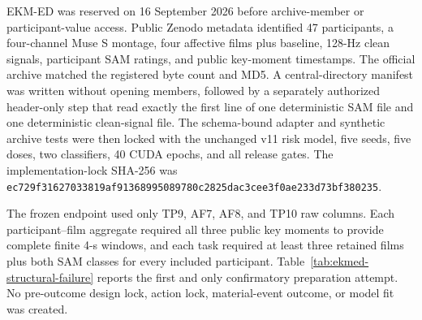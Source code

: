 \documentclass[preprint,12pt]{elsarticle}
\begin{document}
EKM-ED was reserved on 16 September 2026 before archive-member or participant-value access. Public Zenodo metadata identified 47 participants, a four-channel Muse S montage, four affective films plus baseline, 128-Hz clean signals, participant SAM ratings, and public key-moment timestamps. The official archive matched the registered byte count and MD5. A central-directory manifest was written without opening members, followed by a separately authorized header-only step that read exactly the first line of one deterministic SAM file and one deterministic clean-signal file. The schema-bound adapter and synthetic archive tests were then locked with the unchanged v11 risk model, five seeds, five doses, two classifiers, 40 CUDA epochs, and all release gates. The implementation-lock SHA-256 was \texttt{ec729f31\allowbreak{}62703381\allowbreak{}9af91368\allowbreak{}99508978\allowbreak{}0c2825da\allowbreak{}c3cee3f0\allowbreak{}ae233d73\allowbreak{}bf380235}.

The frozen endpoint used only TP9, AF7, AF8, and TP10 raw columns. Each participant--film aggregate required all three public key moments to provide complete finite 4-s windows, and each task required at least three retained films plus both SAM classes for every included participant. Table~\ref{tab:ekmed-structural-failure} reports the first and only confirmatory preparation attempt. No pre-outcome design lock, action lock, material-event outcome, or model fit was created.
\end{document}
